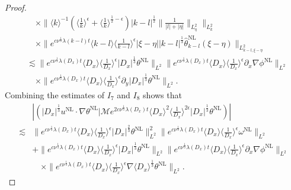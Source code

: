 \documentclass[reqno, 12pt]{amsart} %
\theoremstyle{plain} %
\theoremstyle{definition}
\theoremstyle{remark}
\numberwithin{equation}{section} %
\newcommand{\px}{\partial_x}
\newcommand{\py}{\partial_y}
\begin{document}
\begin{proof}
\begin{align*}
			& \quad \times \|\langle k\rangle^{-1}   (\langle \frac1k \rangle^\epsilon  + \langle \frac1k \rangle^{\frac12-\epsilon}) |k-l|^\frac12   \| \frac{1}{|l| + |\eta|} \|_{L_{ \eta}^2} \|_{L_{k}^2}  \\
			& \quad \times  \|e^{c \nu^{\frac{1}{3}} \lambda(k-l) t}\langle k-l \rangle  \langle \frac{1}{k-l} \rangle^\epsilon    |\xi - \eta||k-l| ^\frac13  \hat{\theta}_{k-l}^{\mathrm{NL}}(\xi-\eta)\|_{L_{k-l, \xi-\eta}^2} \\
			& \lesssim\|e^{c \nu^{\frac{1}{3}} \lambda\left(D_x\right) t}\langle D_x\rangle    \langle \frac{1}{D_x}\rangle^\epsilon  \left|D_x\right|^{\frac{1}{3}} \theta^{\mathrm{NL}}\|_{L^2} \|e^{c \nu^{\frac{1}{3}} \lambda\left(D_x\right) t}\langle D_x\rangle\langle\frac{1}{D_x}\rangle^\epsilon \px \nabla \phi^{\mathrm{NL}}\|_{L^2} \\
			& \quad \times\|e^{c \nu^{\frac{1}{3}} \lambda\left(D_x\right) t}\langle D_x\rangle\langle\frac{1}{D_x}\rangle^\epsilon \py \left|D_x\right|^{\frac{1}{3}} \theta^{\mathrm{NL}}\|_{L^2} .
		\end{align*}
		Combining the estimates of $I_7$ and $I_8$ shows that
		\begin{equation*}\begin{aligned}
				&\left|\left( |D_x|^\frac13 u^{\mathrm{NL}} \cdot \nabla \theta^{\mathrm{NL}} \big| \mathcal{M} e^{2 c \nu^{\frac{1}{3}} \lambda\left(D_x\right) t}\langle D_x\rangle^2\langle\frac{1}{D_x}\rangle^{2 \epsilon} |D_x|^\frac13 \theta^{\mathrm{NL}} \right)\right| \\
				\lesssim& \|e^{c \nu^{\frac{1}{3}} \lambda\left(D_x\right) t}\langle D_x\rangle    \langle \frac{1}{D_x}\rangle^\epsilon  \left|D_x\right|^{\frac{2}{3}} \theta^{\mathrm{NL}}\|_{L^2}^2 \|e^{c \nu^{\frac{1}{3}} \lambda\left(D_x\right) t}\langle D_x\rangle\langle\frac{1}{D_x}\rangle^\epsilon \omega^{\mathrm{NL}}\|_{L^2}  \\
				& + \|e^{c \nu^{\frac{1}{3}} \lambda\left(D_x\right) t}\langle D_x\rangle    \langle \frac{1}{D_x}\rangle^\epsilon  \left|D_x\right|^{\frac{1}{3}} \theta^{\mathrm{NL}}\|_{L^2} \|e^{c \nu^{\frac{1}{3}} \lambda\left(D_x\right) t}\langle D_x\rangle\langle\frac{1}{D_x}\rangle^\epsilon \px \nabla \phi^{\mathrm{NL}}\|_{L^2} \\
				& \quad \times\|e^{c \nu^{\frac{1}{3}} \lambda\left(D_x\right) t}\langle D_x\rangle\langle\frac{1}{D_x}\rangle^\epsilon \nabla \langle D_x\rangle^{\frac{1}{3}} \theta^{\mathrm{NL}}\|_{L^2}. 
		\end{aligned}\end{equation*}
		

\end{proof}
\end{document}
